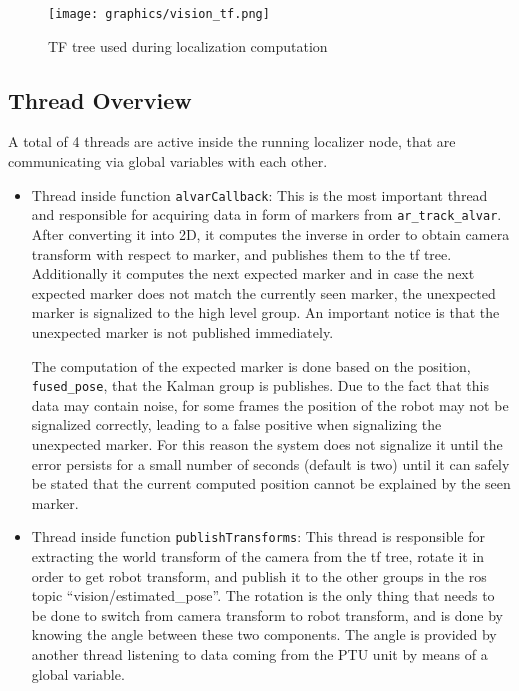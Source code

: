 \begin{figure}
\begin{center}
\texttt{[image: graphics/vision\_tf.png]}
\caption{TF tree used during localization computation}
\label{TF tree}
\end{center}
\end{figure}

\subsection{Thread Overview}
A total of 4 threads are active inside the running localizer node, that are communicating via global variables with each other.

\begin{itemize}
\item Thread inside function \texttt{alvarCallback}: This is the most important thread and responsible for acquiring data in form of markers from \texttt{ar\_track\_alvar}. After converting it into 2D, it computes the inverse in order to obtain camera transform with respect to marker, and publishes them to the tf tree. Additionally it computes the next expected marker and in case the next expected marker does not match the currently seen marker, the unexpected marker is signalized to the high level group. An important notice is that the unexpected marker is not published immediately.

The computation of the expected marker is done based on the position, \texttt{fused\_pose}, that the Kalman group is publishes. Due to the fact that this data may contain noise, for some frames the position of the robot may not be signalized correctly, leading to a false positive when signalizing the unexpected marker. For this reason the system does not signalize it until the error persists for a small number of seconds (default is two) until it can safely be stated that the current computed position cannot be explained by the seen marker.

\item Thread inside function \texttt{publishTransforms}: This thread is responsible for extracting the world transform  of the camera from the tf tree, rotate it in order to get robot transform, and publish it to the other groups in the ros topic “vision/estimated\_pose”. The rotation is the only thing that needs to be done to switch from camera transform to robot transform, and is done by knowing the angle between these two components. The angle is provided by another thread listening to data coming from the PTU unit by means of a global variable.


\end{itemize}

